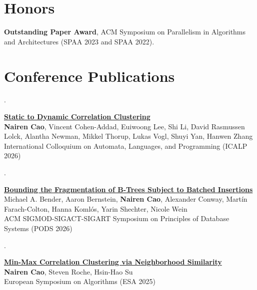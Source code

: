 \documentclass[10pt,a4paper]{article}
\newcounter{pub}
\newcommand{\publication}[3]{\stepcounter{pub}\begin{samepage}\noindent\begin{minipage}[t]{0.045\linewidth}\sffamily\small\color{muted}\thepub.\end{minipage}\begin{minipage}[t]{0.95\linewidth}\textbf{#1}\\#2\\{\small\sffamily\color{ink}#3}\end{minipage}\par\vspace{7pt}\end{samepage}}
\begin{document}
\section{Honors}
\textbf{Outstanding Paper Award}, ACM Symposium on Parallelism in Algorithms and Architectures (SPAA 2023 and SPAA 2022).

\section{Conference Publications}
\publication{\href{https://doi.org/10.4230/LIPIcs.ICALP.2026.48}{Static to Dynamic Correlation Clustering}}{\textbf{Nairen Cao}, Vincent Cohen-Addad, Euiwoong Lee, Shi Li, David Rasmussen Lolck, Alantha Newman, Mikkel Thorup, Lukas Vogl, Shuyi Yan, Hanwen Zhang}{International Colloquium on Automata, Languages, and Programming (ICALP 2026)}
\publication{\href{https://dl.acm.org/doi/10.1145/3801894}{Bounding the Fragmentation of B-Trees Subject to Batched Insertions}}{Michael A. Bender, Aaron Bernstein, \textbf{Nairen Cao}, Alexander Conway, Martín Farach-Colton, Hanna Komlós, Yarin Shechter, Nicole Wein}{ACM SIGMOD-SIGACT-SIGART Symposium on Principles of Database Systems (PODS 2026)}
\publication{\href{https://drops.dagstuhl.de/entities/document/10.4230/LIPIcs.ESA.2025.41}{Min-Max Correlation Clustering via Neighborhood Similarity}}{\textbf{Nairen Cao}, Steven Roche, Hsin-Hao Su}{European Symposium on Algorithms (ESA 2025)}
\newpage
\end{document}
